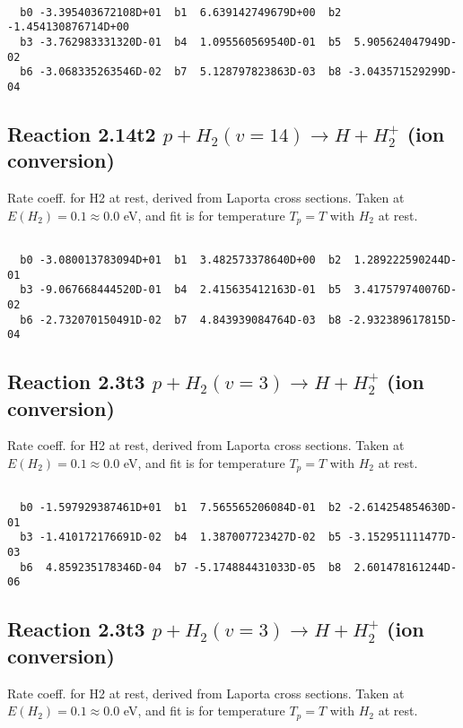 \begin{small}\begin{verbatim}

  b0 -3.395403672108D+01  b1  6.639142749679D+00  b2 -1.454130876714D+00
  b3 -3.762983331320D-01  b4  1.095560569540D-01  b5  5.905624047949D-02
  b6 -3.068335263546D-02  b7  5.128797823863D-03  b8 -3.043571529299D-04

\end{verbatim}\end{small}

\newpage
\subsection{
Reaction 2.14t2
$ p + H_2(v=14) \rightarrow H + H_2^+$ (ion conversion)
}
Rate coeff. for H2 at rest, derived from Laporta cross sections.
Taken at $E(H_2) = 0.1 \approx 0.0$ eV,  and fit is for temperature $T_p=T$ with $H_2$ at rest.

\begin{small}\begin{verbatim}

  b0 -3.080013783094D+01  b1  3.482573378640D+00  b2  1.289222590244D-01
  b3 -9.067668444520D-01  b4  2.415635412163D-01  b5  3.417579740076D-02
  b6 -2.732070150491D-02  b7  4.843939084764D-03  b8 -2.932389617815D-04

\end{verbatim}\end{small}

\newpage
\subsection{
Reaction 2.3t3
$ p + H_2(v=3) \rightarrow H + H_2^+$ (ion conversion)
}
Rate coeff. for H2 at rest, derived from Laporta cross sections.
Taken at $E(H_2) = 0.1 \approx 0.0$ eV,  and fit is for temperature $T_p=T$ with $H_2$ at rest.

\begin{small}\begin{verbatim}

  b0 -1.597929387461D+01  b1  7.565565206084D-01  b2 -2.614254854630D-01
  b3 -1.410172176691D-02  b4  1.387007723427D-02  b5 -3.152951111477D-03
  b6  4.859235178346D-04  b7 -5.174884431033D-05  b8  2.601478161244D-06

\end{verbatim}\end{small}

\newpage
\subsection{
Reaction 2.3t3
$ p + H_2(v=3) \rightarrow H + H_2^+$ (ion conversion)
}
Rate coeff. for H2 at rest, derived from Laporta cross sections.
Taken at $E(H_2) = 0.1 \approx 0.0$ eV,  and fit is for temperature $T_p=T$ with $H_2$ at rest.

